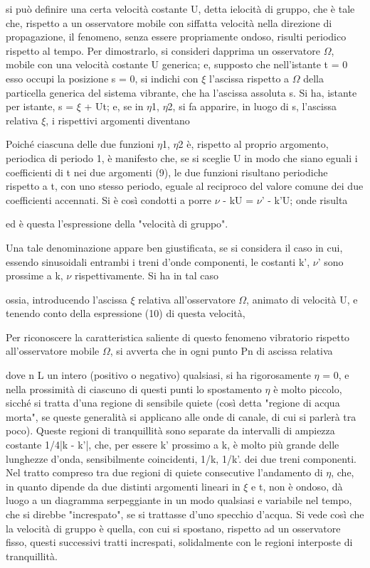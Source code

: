 \documentclass[a4paper]{article}
\begin{document}
si può definire una certa velocità costante U, detta ielocità di gruppo, che è tale che, rispetto a un osservatore mobile con siffatta velocità nella direzione di propagazione, il fenomeno, senza essere propriamente ondoso, risulti periodico rispetto al tempo. Per dimostrarlo, si consideri dapprima un osservatore $\Omega$, mobile con una velocità costante U generica; e, supposto che nell'istante t = 0 esso occupi la posizione s = 0, si indichi con $\xi$ l'ascissa rispetto a $\Omega$ della particella generica del sistema vibrante, che ha l'ascissa assoluta s. Si ha, istante per istante, s = $\xi$ + Ut; e, se in $\eta$1, $\eta$2, si fa apparire, in luogo di s, l'ascissa relativa $\xi$, i rispettivi argomenti diventano

Poiché ciascuna delle due funzioni $\eta$1, $\eta$2 è, rispetto al proprio argomento, periodica di periodo 1, è manifesto che, se si sceglie U in modo che siano eguali i coefficienti di t nei due argomenti (9), le due funzioni risultano periodiche rispetto a t, con uno stesso periodo, eguale al reciproco del valore comune dei due coefficienti accennati. Si è così condotti a porre $\nu$ - kU = $\nu$' - k'U; onde risulta

ed è questa l'espressione della "velocità di gruppo".

Una tale denominazione appare ben giustificata, se si considera il caso in cui, essendo sinusoidali entrambi i treni d'onde componenti, le costanti k', $\nu$' sono prossime a k, $\nu$ rispettivamente. Si ha in tal caso

ossia, introducendo l'ascissa $\xi$ relativa all'osservatore $\Omega$, animato di velocità U, e tenendo conto della espressione (10) di questa velocità,

Per riconoscere la caratteristica saliente di questo fenomeno vibratorio rispetto all'osservatore mobile $\Omega$, si avverta che in ogni punto Pn di ascissa relativa

dove n L un intero (positivo o negativo) qualsiasi, si ha rigorosamente $\eta$ = 0, e nella prossimità di ciascuno di questi punti lo spostamento $\eta$ è molto piccolo, sicché si tratta d'una regione di sensibile quiete (così detta "regione di acqua morta", se queste generalità si applicano alle onde di canale, di cui si parlerà tra poco). Queste regioni di tranquillità sono separate da intervalli di ampiezza costante 1/4|k - k'|, che, per essere k' prossimo a k, è molto più grande delle lunghezze d'onda, sensibilmente coincidenti, 1/k, 1/k'. dei due treni componenti. Nel tratto compreso tra due regioni di quiete consecutive l'andamento di $\eta$, che, in quanto dipende da due distinti argomenti lineari in $\xi$ e t, non è ondoso, dà luogo a un diagramma serpeggiante in un modo qualsiasi e variabile nel tempo, che si direbbe "increspato", se si trattasse d'uno specchio d'acqua. Si vede così che la velocità di gruppo è quella, con cui si spostano, rispetto ad un osservatore fisso, questi successivi tratti increspati, solidalmente con le regioni interposte di tranquillità.
\end{document}
